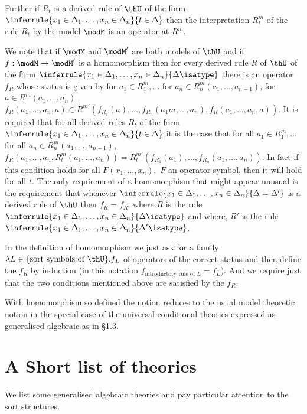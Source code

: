 Further if $R_t$ is a derived rule of $\thU$ of the form $\inferrule{x_1\in\Delta_1,\ldots,x_n\in\Delta_n}{t\in\Delta}$ then the interpretation $R_t^m$ of the rule $R_t$ by the model $\modM$ is an operator at $R^m$.

We note that if $\modM$ and $\modM'$ are both models of $\thU$ and if $f:\modM\to\modM'$ is a homomorphism then for every derived rule $R$ of $\thU$ of the form $\inferrule{x_1\in\Delta_1,\ldots,x_n\in\Delta_n}{\Delta\isatype}$ there is an operator $f_R$ whose status is given by for $a_1\in R_1^m,\ldots$ for $a_n\in R_n^m(a_1,\ldots,a_{n-1})$, for $a\in R^m(a_1,\ldots,a_n)$, $f_R(a_1,\ldots,a_n,a)\in R^{m'}(f_{R_1}(a),\ldots,f_{R_n}(a_1m,\ldots,a_n),f_R(a_1,\ldots,a_n,a))$.
%
It is required that for all derived rules $R_t$ of the form $\inferrule{x_1\in\Delta_1,\ldots,x_n\in\Delta_n}{t\in\Delta}$ it is the case that for all $a_1\in R_1^m,\ldots$ for all $a_n\in R_n^m(a_1,\ldots,a_{n-1})$, $f_R(a_1,\ldots,a_n,R_t^m(a_1,\ldots,a_n)) = R_t^{m'}(f_{R_1}(a_1),\ldots,f_{R_n}(a_1,\ldots,a_n)).$
%
In fact if this condition holds for all $F(x_1,\ldots,x_n),$ $F$ an operator symbol, then it will hold for all $t$.
%
The only requirement of a homomorphism that might appear unusual is the requirement that whenever $\inferrule{x_1\in\Delta_1,\ldots,x_n\in\Delta_n}{\Delta=\Delta'}$ is a derived rule of $\thU$ then $f_R=f_{R'}$ where $R$ is the rule $\inferrule{x_1\in\Delta_1,\ldots,x_n\in\Delta_n}{\Delta\isatype}$ and where, $R'$ is the rule $\inferrule{x_1\in\Delta_1,\ldots,x_n\in\Delta_n}{\Delta'\isatype}$.

In the definition of homomorphism we just ask for a family $\lambda L\in\{\text{sort symbols of }\thU\}.f_L$ of operators of the correct status and then define the $f_R$ by induction (in this notation $f_{\text{introductory rule of $L$}} = f_L$).
%
And we require just that the two conditions mentioned above are satisfied by the $f_R$.

With homomorphism so defined the notion reduces to the usual model theoretic notion in the special case of the universal conditional theories expressed as generalised algebraic as in \S 1.3.

\section{A Short list of theories} \label{sec:source-1-10}

We list some generalised algebraic theories and pay particular attention to the sort structures.

